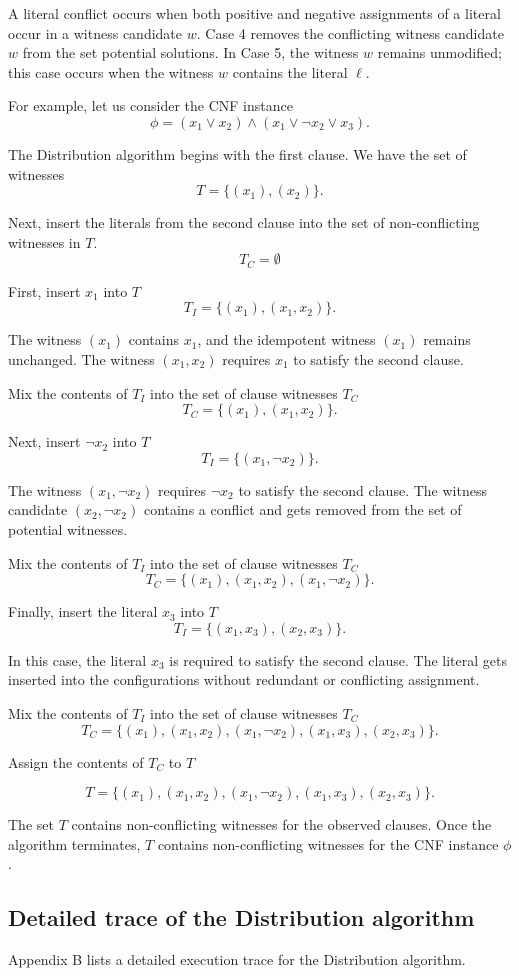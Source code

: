 A literal conflict occurs when both positive and negative assignments of a literal occur in a witness candidate $w$.  Case 4 removes the conflicting witness candidate $w$ from the set potential solutions.  In Case 5, the witness $w$ remains unmodified; this case occurs when the witness $w$ contains the literal $\ell$.

For example, let us consider the CNF instance
\[
\phi = (x_1 \vee x_2) \wedge (x_1 \vee \neg x_2 \vee x_3).
\]		

The Distribution algorithm begins with the first clause.  We have the set of witnesses
\[
T = \{ (x_1), (x_2) \}.
\] 

Next, insert the literals from the second clause into the set of non-conflicting witnesses in $T$.
\[
T_C = \emptyset
\]

\noindent First, insert $x_1$ into $T$
\[
T_I = \{ (x_1), (x_1, x_2) \}.
\] 

\noindent The witness $(x_1)$ contains $x_1$, and the idempotent witness $(x_1)$ remains unchanged.  The witness $(x_1, x_2)$ requires $x_1$ to satisfy the second clause.

Mix the contents of $T_I$ into the set of clause witnesses $T_C$
\[
T_C = \{ (x_1), (x_1, x_2) \}.
\]

\noindent Next, insert $\neg x_2$ into $T$
\[
T_I = \{ (x_1, \neg x_2) \}.
\] 

\noindent The witness $(x_1, \neg x_2)$ requires $\neg x_2$ to satisfy the second clause.  The witness candidate $(x_2, \neg x_2)$ contains a conflict and gets removed from the set of potential witnesses.

Mix the contents of $T_I$ into the set of clause witnesses $T_C$
\[
T_C = \{ (x_1), (x_1, x_2), (x_1, \neg x_2) \}.
\]

Finally, insert the literal $x_3$ into $T$
\[
T_I = \{ (x_1, x_3), (x_2, x_3) \}.
\] 

\noindent In this case, the literal $x_3$ is required to satisfy the second clause.  The literal gets inserted into the configurations without redundant or conflicting assignment.

Mix the contents of $T_I$ into the set of clause witnesses $T_C$
\[
T_C = \{ (x_1), (x_1, x_2), (x_1, \neg x_2), (x_1, x_3), (x_2, x_3) \}.
\]

Assign the contents of $T_C$ to $T$

\[
T = \{ (x_1), (x_1, x_2), (x_1, \neg x_2), (x_1, x_3), (x_2, x_3) \}.
\]

The set $T$ contains non-conflicting witnesses for the observed clauses.  Once the algorithm terminates, $T$ contains non-conflicting witnesses for the CNF instance $\phi$. 
	
	\subsection{Detailed trace of the Distribution algorithm}

Appendix B lists a detailed execution trace for the Distribution algorithm.

%
%
%	
